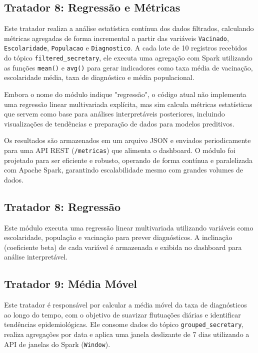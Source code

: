\documentclass[a4paper,12pt]{article}
\begin{document}
\subsection{Tratador 8: Regressão e Métricas}

Este tratador realiza a análise estatística contínua dos dados filtrados, calculando métricas agregadas de forma incremental a partir das variáveis \texttt{Vacinado}, \texttt{Escolaridade}, \texttt{Populacao} e \texttt{Diagnostico}. A cada lote de 10 registros recebidos do tópico \texttt{filtered\_secretary}, ele executa uma agregação com Spark utilizando as funções \texttt{mean()} e \texttt{avg()} para gerar indicadores como taxa média de vacinação, escolaridade média, taxa de diagnóstico e média populacional.

Embora o nome do módulo indique "regressão", o código atual não implementa uma regressão linear multivariada explícita, mas sim calcula métricas estatísticas que servem como base para análises interpretáveis posteriores, incluindo visualizações de tendências e preparação de dados para modelos preditivos.

Os resultados são armazenados em um arquivo JSON e enviados periodicamente para uma API REST (\texttt{/metricas}) que alimenta o dashboard. O módulo foi projetado para ser eficiente e robusto, operando de forma contínua e paralelizada com Apache Spark, garantindo escalabilidade mesmo com grandes volumes de dados.


\subsection{Tratador 8: Regressão}

Este módulo executa uma regressão linear multivariada utilizando variáveis como escolaridade, população e vacinação para prever diagnósticos. A inclinação (coeficiente beta) de cada variável é armazenada e exibida no dashboard para análise interpretável.

\subsection{Tratador 9: Média Móvel}

Este tratador é responsável por calcular a média móvel da taxa de diagnósticos ao longo do tempo, com o objetivo de suavizar flutuações diárias e identificar tendências epidemiológicas. Ele consome dados do tópico \texttt{grouped\_secretary}, realiza agregações por data e aplica uma janela deslizante de 7 dias utilizando a API de janelas do Spark (\texttt{Window}).
\end{document}
